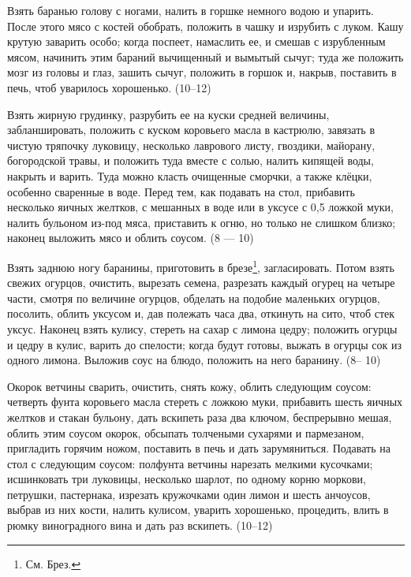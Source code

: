 Взять баранью голову с ногами, налить в горшке немного водою и упарить. После этого мясо с костей обобрать, положить в чашку и изрубить с луком. Кашу крутую заварить особо; когда поспеет, намаслить ее, и смешав с изрубленным мясом, начинить этим бараний вычищенный и вымытый сычуг; туда же положить мозг из головы и глаз, зашить сычуг, положить в горшок и, накрыв, поставить в печь, чтоб уварилось хорошенько. (10--12) 


Взять жирную грудинку, разрубить ее на куски средней величины, забланшировать, положить с куском коровьего масла в кастрюлю, завязать в чистую тряпочку луковицу, несколько лаврового листу, гвоздики, майорану, богородской травы, и положить туда вместе с солью, налить кипящей воды, накрыть и варить. Туда можно класть очищенные сморчки, а также клёцки, особенно сваренные в воде. Перед тем, как подавать на стол, прибавить несколько яичных желтков, с мешанных в воде или в уксусе с 0,5 ложкой муки, налить бульоном из-под мяса, приставить к огню, но только не слишком близко; наконец выложить мясо и облить соусом. (8 — 10) 


Взять заднюю ногу баранины, приготовить в брезе\footnote{См. Брез.}, загласировать. Потом взять свежих огурцов, очистить, вырезать семена, разрезать каждый огурец на четыре части, смотря по величине огурцов, обделать на подобие маленьких огурцов, посолить, облить уксусом и, дав полежать часа два, откинуть на сито, чтоб стек уксус. Наконец взять кулису, стереть на сахар с лимона цедру; положить огурцы и цедру в кулис, варить до спелости; когда будут готовы, выжать в огурцы сок из одного лимона. Выложив соус на блюдо, положить на него баранину. (8-- 10) 


Окорок ветчины сварить, очистить, снять кожу, облить следующим соусом: четверть фунта коровьего масла стереть с ложкою муки, прибавить шесть яичных желтков и стакан бульону, дать вскипеть раза два ключом, беспрерывно мешая, облить этим соусом окорок, обсыпать толчеными сухарями и пармезаном, пригладить горячим ножом, поставить в печь и дать зарумяниться. Подавать на стол с следующим соусом: полфунта ветчины нарезать мелкими кусочками; исшинковать три луковицы, несколько шарлот, по одному корню моркови, петрушки, пастернака, изрезать кружочками один лимон и шесть анчоусов, выбрав из них кости, налить кулисом, уварить хорошенько, процедить, влить в рюмку виноградного вина и дать раз вскипеть. (10--12) 

